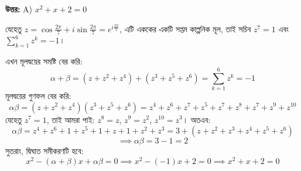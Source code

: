 \documentclass[12pt, a4paper]{article}
\begin{document}
\vspace{0.5em}
\begin{tcolorbox}[answerbox]
    \textbf{\color{success} উত্তর:} A) $x^2 + x + 2 = 0$
\end{tcolorbox}
\vspace{1em}

\begin{tcolorbox}[solutionbox={সমাধান (Solution)}]
    \noindent
    যেহেতু $z = \cos\frac{2\pi}{7} + i\sin\frac{2\pi}{7} = e^{i \frac{2\pi}{7}}$, এটি এককের একটি সপ্তম কাল্পনিক মূল, তাই সচিব $z^7 = 1$ এবং $\sum_{k=1}^6 z^k = -1$। 
    
    এখন মূলদ্বয়ের সমষ্টি বের করি:
    \[ \alpha + \beta = (z + z^2 + z^4) + (z^3 + z^5 + z^6) = \sum_{k=1}^6 z^k = -1 \]
    মূলদ্বয়ের গুণফল বের করি:
    \[ \alpha\beta = (z + z^2 + z^4)(z^3 + z^5 + z^6) = z^4 + z^6 + z^7 + z^5 + z^7 + z^8 + z^7 + z^9 + z^{10} \]
    যেহেতু $z^7 = 1$, তাই আমরা পাই: $z^8 = z$, $z^9 = z^2$, $z^{10} = z^3$। অতএব:
    \[ \alpha\beta = z^4 + z^6 + 1 + z^5 + 1 + z + 1 + z^2 + z^3 = 3 + (z + z^2 + z^3 + z^4 + z^5 + z^6) \]
    \[ \implies \alpha\beta = 3 - 1 = 2 \]
    সুতরাং, দ্বিঘাত সমীকরণটি হবে:
    \[ x^2 - (\alpha+\beta)x + \alpha\beta = 0 \implies x^2 - (-1)x + 2 = 0 \implies x^2 + x + 2 = 0 \]
\end{tcolorbox}
\end{document}
